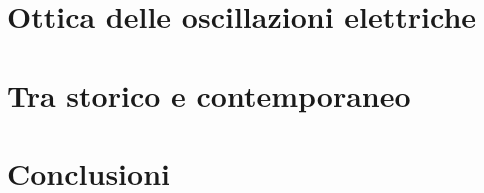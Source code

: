 \documentclass[12pt,a4paper,twoside]{book}
\begin{document}
\thispagestyle{chapterplain}
\label{chap:storia_onde_em}

\clearpage{\pagestyle{empty}\cleardoublepage}

\chapter{Ottica delle oscillazioni elettriche}
\thispagestyle{chapterplain}
\label{chap:Ottica_oscillazioni}




\chapter{Tra storico e contemporaneo}
\thispagestyle{chapterplain}
\label{chap:tra_storico_contemporaneo}
% 
\clearpage{\pagestyle{empty}\cleardoublepage}



\chapter{Conclusioni}
\thispagestyle{chapterplain}
\label{chap:conclusion}
% 
\clearpage{\pagestyle{empty}\cleardoublepage}
\end{document}
